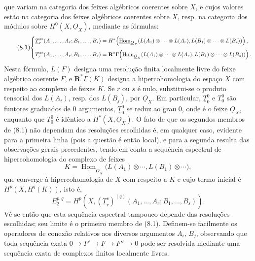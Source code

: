 \documentclass[11pt,twoside,openany]{book}
\numberwithin{equation}{section}
\newcommand{\src}[1]{%
  \phantomsection\hypertarget{src:#1}{}%
  \marginpar{\raggedleft\footnotesize\sffamily #1}%
}
\newcommand{\Osh}{\underline{O}}
\newcommand{\Homsh}{\underline{\operatorname{Hom}}}
\theoremstyle{plain}
\theoremstyle{definition}
\theoremstyle{remark}
\newcommand{\FgaUnitKey}{frontmatter}
\renewcommand{\src}[1]{%
  \phantomsection\hypertarget{src:\FgaUnitKey:#1}{}%
  \marginpar{\raggedleft\footnotesize\sffamily #1}%
}
\begin{document}
\src{190}
que variam na categoria dos feixes algébricos coerentes sobre $X$, e cujos
valores estão na categoria dos feixes algébricos coerentes sobre $X$,
resp. na categoria dos módulos sobre $H^{0}(X,\Osh_X)$, mediante as fórmulas:
\begin{equation}\tag{8.1}
\resizebox{\textwidth}{!}{$
\left\{
\begin{aligned}
\underline{T}_{r}^{s*}(A_1,\ldots,A_r;B_1,\ldots,B_s)
  &={}H^{*}\!\left(
    \Homsh_{\Osh_X}\!\left(
      L(A_1)\otimes\cdots\otimes L(A_r),
      L(B_1)\otimes\cdots\otimes L(B_s)
    \right)\right),\\[3pt]
T_{r}^{s*}(A_1,\ldots,A_r;B_1,\ldots,B_s)
  &={}\mathbf R^{*}\Gamma\!\left(
    \Homsh_{\Osh_X}\!\left(
      L(A_1)\otimes\cdots\otimes L(A_r),
      L(B_1)\otimes\cdots\otimes L(B_s)
    \right)\right).
\end{aligned}
\right.
$}
\end{equation}
Nesta fórmula, $L(F)$ designa uma resolução finita localmente livre do
feixe algébrico coerente $F$, e $\mathbf R^{*}\Gamma(K)$ designa
a hipercohomologia do espaço $X$ com respeito ao complexo de feixes $K$. Se
$r$ ou $s$ é nulo, substitui-se o produto tensorial dos $L(A_i)$, resp. dos
$L(B_j)$, por $\Osh_X$. Em particular, $\underline{T}_{0}^{0}$ e $T_{0}^{0}$
são funtores graduados de 0 argumentos, $\underline{T}_{0}^{0}$ se reduz ao
grau 0, onde é o feixe $\Osh_X$, enquanto que $T_{0}^{0}$ é idêntico a
$H^{*}(X,\Osh_X)$. O fato de que os segundos membros de (8.1) não dependam
das resoluções escolhidas é, em qualquer caso, evidente para a primeira linha
(pois a questão é então local), e para a segunda resulta das observações
gerais precedentes, tendo em conta a sequência espectral de
hipercohomologia do complexo de feixes
\[
  K=\Homsh_{\Osh_X}\bigl(L(A_1)\otimes\cdots,
      L(B_1)\otimes\cdots\bigr),
\]
que converge à hipercohomologia de $X$ com respeito a $K$ e cujo termo
inicial é $H^{p}(X,H^{q}(K))$, isto é,
\begin{equation}\tag{8.2}
  E_{2}^{p,q}
  =H^{p}\!\left(X,
    (\underline{T}_{r}^{s})^{(q)}
      (A_1,\ldots,A_r;B_1,\ldots,B_s)\right).
\end{equation}
Vê-se então que esta sequência espectral tampouco depende das resoluções
escolhidas; seu limite é o primeiro membro de (8.1). Definem-se
facilmente os operadores de conexão relativos aos diversos argumentos $A_i$, $B_j$,
observando que toda sequência exata
$0\longrightarrow F'\longrightarrow F\longrightarrow F''\longrightarrow0$
pode ser resolvida mediante uma sequência exata de complexos finitos localmente livres.
\end{document}

